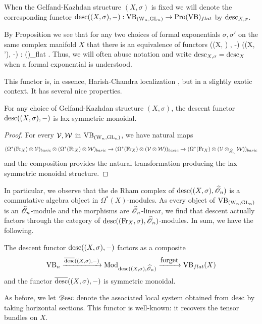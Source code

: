 When the Gelfand-Kazhdan structure $(X, \sigma)$ is fixed we will denote the corresponding functor ${\rm desc}((X, \sigma), -) :  {\rm VB}_{({{\rm W}_n}, {\rm GL}_n)} \to {\rm Pro}({\rm VB})_{flat}$ by ${\rm desc}_{X,\sigma}$. 

By Proposition \label{gauge equiv} we see that for any two choices of formal exponentials $\sigma,\sigma'$ on the same complex manifold $X$ that there is an equivalence of functors
\ben
\desc((X, \sigma) , -) \simeq \desc((X, \sigma'), -) :  \WGLCAT \to \Pro(\VB)_{flat} .
\een
Thus, we will often abuse notation and write ${\rm desc}_{X,\sigma} = {\rm desc}_X$ when a formal exponential is understood. 

This functor is, in essence, Harish-Chandra localization \cite{BB, BL}, but in a slightly exotic context.
It has several nice properties.

\begin{lem}\label{prop lax}
For any choice of Gelfand-Kazhdan structure $(X,\sigma)$, the descent functor ${\rm desc}((X,\sigma),-)$ is lax symmetric monoidal.
\end{lem}

\begin{proof}
For every $\mathcal{V},\mathcal{W}$ in ${\rm VB}_{({{\rm W}_n}, {\rm GL}_n)}$, we have natural maps
\[
(\Omega^*({\rm Fr}_X) \otimes \mathcal{V})_{basic} \otimes (\Omega^*({\rm Fr}_X) \otimes \mathcal{W})_{basic} \to (\Omega^*({\rm Fr}_X) \otimes (\mathcal{V} \otimes \mathcal{W}))_{basic} \to (\Omega^*({\rm Fr}_X) \otimes (\mathcal{V} \otimes_{\widehat{\mathscr O}_n} \mathcal{W}))_{basic}
\]
and the composition provides the natural transformation producing the lax symmetric monoidal structure.
\end{proof}

In particular, we observe that the de Rham complex of ${\rm desc}((X,\sigma),\widehat{\mathscr O}_n)$ is a commutative algebra object in $\Omega^*(X)$-modules. 
As every object of ${\rm VB}_{({{\rm W}_n}, {\rm GL}_n)}$ is an $\widehat{\mathscr O}_n$-module and the morphisms are $\widehat{\mathscr O}_n$-linear, 
we find that descent actually factors through the category of ${\rm desc}(({\rm Fr}_X,\sigma),\widehat{\mathscr O}_n)$-modules. 
In sum, we have the following.

\begin{lem}
The descent functor ${\rm desc}((X,\sigma),-)$ factors as a composite
\[
\VB_n \xto{\overline{\desc}((X,\sigma),-)} \Mod_{\desc((X,\sigma),\hO_n)} \xto{\txt{forget}} \VB_{flat}(X)
\]
and the functor $\overline{{\rm desc}}((X,\sigma),-)$ is symmetric monoidal.
\end{lem}

As before, we let $\mathscr{D}{\rm esc}$ denote the associated local system obtained from ${\rm desc}$ by taking horizontal sections. This functor is well-known: it recovers the tensor bundles on $X$.

